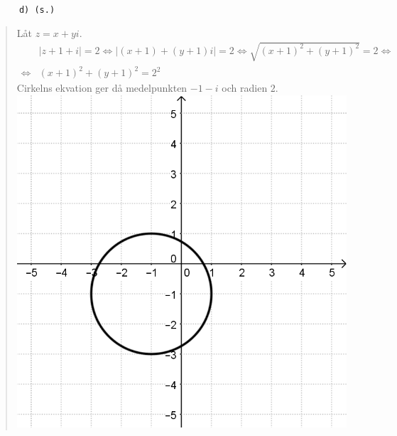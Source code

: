 \documentclass[a4paper]{article}
\newcommand{\tskcol}[1]{\textcolor{tskcol}{#1}}
\begin{document}
	\texttt{\tskcol{~~~~~~d) (s.)}}
	\begin{quotation}
		\noindent
		Låt $z=x+yi$.
		\begin{align*}
		&|z+1+i|=2 \Leftrightarrow
		|(x+1)+(y+1)i|=2 \Leftrightarrow
		\sqrt{(x+1)^2+(y+1)^2}=2 \Leftrightarrow \\ \Leftrightarrow
		&(x+1)^2+(y+1)^2=2^2
		\end{align*}
		Cirkelns ekvation ger då medelpunkten $-1-i$ och radien $2$. \\
		\includegraphics[scale=0.2]{images/612d.PNG}
	\end{quotation}
	
\end{document}
